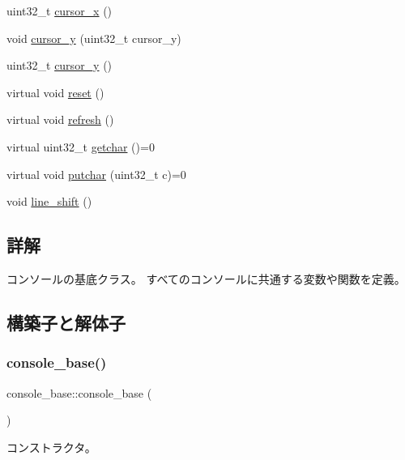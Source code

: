 \begin{DoxyCompactItemize}
uint32\+\_\+t \hyperlink{classconsole__base_ad59a91b66625ce8c248932772354383f}{cursor\+\_\+x} ()
\item 
void \hyperlink{classconsole__base_aba47a7cadd9a68dc6f7a98c6a3080a72}{cursor\+\_\+y} (uint32\+\_\+t cursor\+\_\+y)
\item 
uint32\+\_\+t \hyperlink{classconsole__base_a6182707c71b93d9e94a621bb81856141}{cursor\+\_\+y} ()
\item 
virtual void \hyperlink{classconsole__base_a79693833fdcd6b83c6b9a18919355bb3}{reset} ()
\item 
virtual void \hyperlink{classconsole__base_abd597aeba24dbc8552479b58db052980}{refresh} ()
\item 
virtual uint32\+\_\+t \hyperlink{classconsole__base_ab06fe008a39c09c60e427946f486833e}{getchar} ()=0
\item 
virtual void \hyperlink{classconsole__base_a584c38d4ca34363f399895e30133b814}{putchar} (uint32\+\_\+t c)=0
\item 
void \hyperlink{classconsole__base_ace51a1b9c9e3354c98622f7c122eb566}{line\+\_\+shift} ()
\end{DoxyCompactItemize}


\subsection{詳解}
コンソールの基底クラス。 すべてのコンソールに共通する変数や関数を定義。 

\subsection{構築子と解体子}
\hypertarget{classconsole__base_ab72690282352009b2eca56c12d0e6529}{}\label{classconsole__base_ab72690282352009b2eca56c12d0e6529} 
\subsubsection{\texorpdfstring{console\+\_\+base()}{console\_base()}\hspace{0.1cm}{\footnotesize\ttfamily [1/3]}}
{\footnotesize\ttfamily console\+\_\+base\+::console\+\_\+base (\begin{DoxyParamCaption}{ }\end{DoxyParamCaption})}

コンストラクタ。 \hypertarget{classconsole__base_a956275f5f7c00148939cfe5bab999b7a}{}\label{classconsole__base_a956275f5f7c00148939cfe5bab999b7a} 
